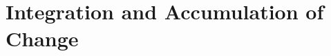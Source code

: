 \documentclass[../abcalc.tex]{subfiles}
\begin{document}
\chapter{Integration and Accumulation of Change}
\end{document}
